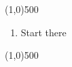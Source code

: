 


\fontsize{20}{24}
\line(1,0){500}
\fontsize{12}{15}
\begin{enumerate}
\item Start there
\end{enumerate}
\vfill\line(1,0){500}

